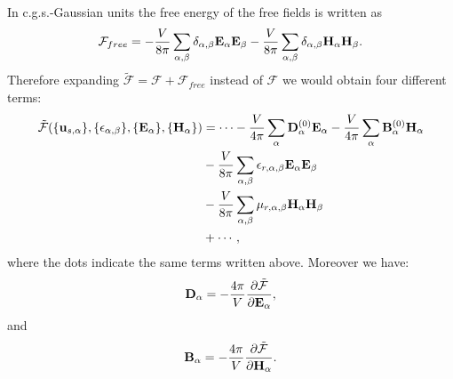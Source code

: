 \documentclass[12pt,a4paper]{article}
\begin{document}
{\color{orange} In c.g.s.-Gaussian units the free energy of the 
free fields is written as
\begin{equation}
\mathcal{F}_{free}=-{V \over 8 \pi} \sum_{\alpha,\beta} 
\delta_{\alpha,\beta} {\bf E}_\alpha {\bf E}_\beta-
{V \over 8 \pi} \sum_{\alpha,\beta} 
\delta_{\alpha,\beta} {\bf H}_\alpha {\bf H}_\beta.
\end{equation}
Therefore expanding $\mathcal{\tilde F} = \mathcal{F} + \mathcal{F}_{free}$
instead of $\mathcal{F}$ we would obtain four different terms:
\begin{align}
\mathcal{\tilde F}(\{{\bf u}_{s,\alpha}\}, \{\epsilon_{\alpha,\beta}\},
\{ {\bf E}_\alpha\}, \{{\bf H}_\alpha\})&= \cdots -
{V\over 4 \pi} \sum_{\alpha} {\bf D}^{(0)}_\alpha {\bf E}_\alpha - 
{V \over 4 \pi} \sum_{\alpha} {\bf B}^{(0)}_\alpha {\bf H}_\alpha \nonumber \\
&- {V\over 8 \pi} \sum_{\alpha,\beta} 
\epsilon_{r,\alpha,\beta}
{\bf E}_{\alpha}
{\bf E}_{\beta} \nonumber \\
&- {V\over 8 \pi} \sum_{\alpha,\beta} 
\mu_{r,\alpha,\beta}
{\bf H}_{\alpha}
{\bf H}_{\beta} \nonumber \\
&+ \cdots,
\end{align}
where the dots indicate the same terms written above.
Moreover we have:
\begin{equation}
{\bf D}_\alpha = -{4 \pi \over V} {\partial \mathcal{\tilde F} \over 
\partial {\bf E}_\alpha},
\end{equation}
and
\begin{equation}
{\bf B}_\alpha = -{4 \pi \over V} {\partial \mathcal{\tilde F} \over 
\partial {\bf H}_\alpha}.
\end{equation}
}
\end{document}
